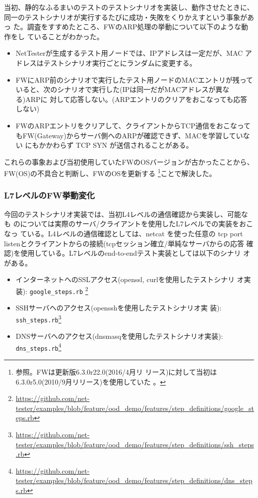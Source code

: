 当初、静的なふるまいのテストのテストシナリオを実装し、動作させたときに、
同一のテストシナリオが実行するたびに成功・失敗をくりかえすという事象があっ
た。調査をすすめたところ、FWのARP処理の挙動について以下のような動作をし
ていることがわかった。
\begin{itemize}
 \item NetTesterが生成するテスト用ノードでは、IPアドレスは一定だが、MAC
       アドレスはテストシナリオ実行ごとにランダムに変更する。
 \item FWにARP前のシナリオで実行したテスト用ノードのMACエントリが残って
       いると、次のシナリオで実行した(IPは同一だがMACアドレスが異なる)ARPに
       対して応答しない。(ARPエントリのクリアをおこなっても応答しない)
 \item FWのARPエントリをクリアして、クライアントからTCP通信をおこなって
       もFW(Gateway)からサーバ側へのARPが確認できず、MACを学習していない
       にもかかわらず TCP SYN が送信されることがある。
\end{itemize}

これらの事象および当初使用していたFWのOSバージョンが古かったことから、
FW(OS)の不具合と判断し、FWのOSを更新する
\footnote{参照。FWは更新版6.3.0r22.0(2016/4月リ
リース)に対して当初は6.3.0r5.0(2010/9月リリース)を使用していた
\cite{screenos-releases}。}ことで解決した。

   \subsubsection{L7レベルのFW挙動変化}
今回のテストシナリオ実装では、当初L4レベルの通信確認から実装し、可能なも
のについては実際のサーバ/クライアントを使用したL7レベルでの実装をおこなっ
ている。L4レベルの通信確認としては、netcat を使った任意の tcp port
listenとクライアントからの接続(tcpセッション確立/単純なサーバからの応答
確認)を使用している。L7レベルのend-to-endテスト実装としては以下のシナリ
オがある。
\begin{itemize}
 \item インターネットへのSSLアクセス(openssl, curlを使用したテストシナリ
       オ実装): \verb|google_steps.rb|
       \footnote{\url{https://github.com/net-tester/examples/blob/feature/ood_demo/features/step_definitions/google_steps.rb}}
 \item SSHサーバヘのアクセス(opensshを使用したテストシナリオ実
       装): \verb|ssh_steps.rb|\footnote{\url{https://github.com/net-tester/examples/blob/feature/ood_demo/features/step_definitions/ssh_steps.rb}}
 \item DNSサーバへのアクセス(dnsmasqを使用したテストシナリオ実装):
       \verb|dns_steps.rb|\footnote{\url{https://github.com/net-tester/examples/blob/feature/ood_demo/features/step_definitions/dns_steps.rb}}
\end{itemize}

